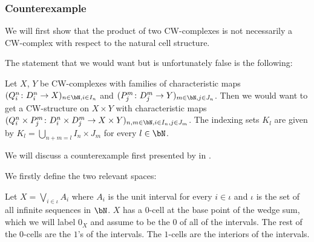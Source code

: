 \subsubsection*{Counterexample}

We will first show that the product of two CW-complexes is not necessarily a CW-complex with respect to the natural cell structure.

\begin{rem} \label{rem:wrongproduct}
    The statement that we would want but is unfortunately false is the following: 

    Let $X$, $Y$ be CW-complexes with families of characteristic maps $(Q_i^n \colon D_i^n \to X)_{n \in \bN, i \in I_n}$ and $(P_j^m \colon D_j^m \to Y)_{m \in \bN, j \in J_n}$. 
    Then we would want to get a CW-structure on $X \times Y$ with characteristic maps $(Q_i^n \times P_j^m \colon D_i^n \times D_j^m \to X \times Y)_{n,m \in \bN,i \in I_n,j \in J_m}$.
    The indexing sets $K_l$ are given by $K_l = \bigcup_{n + m = l}I_n \times J_m$ for every $l \in \bN$.
\end{rem}

We will discuss a counterexample first presented by  in \cite{Dowker1952}. 

We firstly define the two relevant spaces: 

\begin{defi}
    Let $X = \bigvee_{i \in \iota} A_i$ where $A_i$ is the unit interval for every $i \in \iota$ and $\iota$ is the set of all infinite sequences in $\bN$. 
    $X$ has a $0$-cell at the base point of the wedge sum, which we will label $0_X$ and assume to be the $0$ of all of the intervals. The rest of the $0$-cells are the $1$'s of the intervals. 
    The $1$-cells are the interiors of the intervals. 
\end{defi}

